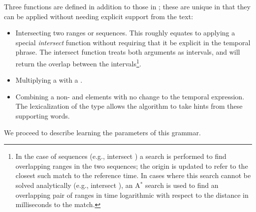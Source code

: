 Three functions are defined in addition to those in ;
	these are unique in that they can be applied without needing explicit 
	support from the text:

\begin{itemize}
	\item Intersecting two ranges or sequences.
		This roughly equates to applying a special \textit{intersect} function
			without requiring that it be explicit in the temporal phrase.
		The intersect function treats both arguments as intervals, and will return
			the overlap between the intervals\footnote{
				In the case of sequences (e.g.,  intersect ) a
					search is performed to find overlapping ranges in the two sequences;
					the origin is updated to refer to the closest such
					match to the reference time.
				In cases where this search cannot be solved analytically
					(e.g.,  intersect ), an A$^{*}$
					search is used to find an overlapping pair of ranges
					in time logarithmic with respect to
					the distance in milliseconds to the match.
		}.
	\item Multiplying a  with a .
	\item Combining a non- and  elements with no change to the
			temporal expression.
		The lexicalization of the  type allows the algorithm
			to take hints from these supporting words.
\end{itemize}

We proceed to describe learning the parameters of this grammar.

